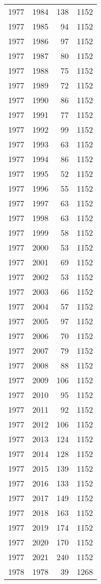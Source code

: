 \documentclass[
  10pt,
  letterpaper,
  DIV=11,
  numbers=noendperiod,
  twoside]{scrartcl}
\begin{document}
\begin{longtable}[]{@{}rrrr@{}}
1977 & 1984 & 138 & 1152 \\
1977 & 1985 & 94 & 1152 \\
1977 & 1986 & 97 & 1152 \\
1977 & 1987 & 80 & 1152 \\
1977 & 1988 & 75 & 1152 \\
1977 & 1989 & 72 & 1152 \\
1977 & 1990 & 86 & 1152 \\
1977 & 1991 & 77 & 1152 \\
1977 & 1992 & 99 & 1152 \\
1977 & 1993 & 63 & 1152 \\
1977 & 1994 & 86 & 1152 \\
1977 & 1995 & 52 & 1152 \\
1977 & 1996 & 55 & 1152 \\
1977 & 1997 & 63 & 1152 \\
1977 & 1998 & 63 & 1152 \\
1977 & 1999 & 58 & 1152 \\
1977 & 2000 & 53 & 1152 \\
1977 & 2001 & 69 & 1152 \\
1977 & 2002 & 53 & 1152 \\
1977 & 2003 & 66 & 1152 \\
1977 & 2004 & 57 & 1152 \\
1977 & 2005 & 97 & 1152 \\
1977 & 2006 & 70 & 1152 \\
1977 & 2007 & 79 & 1152 \\
1977 & 2008 & 88 & 1152 \\
1977 & 2009 & 106 & 1152 \\
1977 & 2010 & 95 & 1152 \\
1977 & 2011 & 92 & 1152 \\
1977 & 2012 & 106 & 1152 \\
1977 & 2013 & 124 & 1152 \\
1977 & 2014 & 128 & 1152 \\
1977 & 2015 & 139 & 1152 \\
1977 & 2016 & 133 & 1152 \\
1977 & 2017 & 149 & 1152 \\
1977 & 2018 & 163 & 1152 \\
1977 & 2019 & 174 & 1152 \\
1977 & 2020 & 170 & 1152 \\
1977 & 2021 & 240 & 1152 \\
1978 & 1978 & 39 & 1268 \\

\end{longtable}
\end{document}
